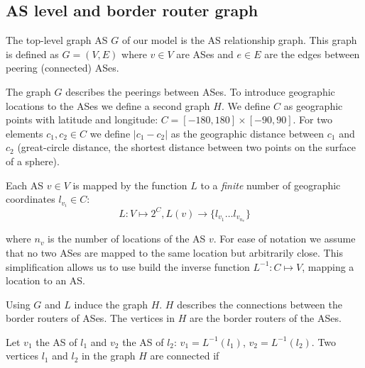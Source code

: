\documentclass{sig-alternate-10pt}
\begin{document}
\subsection{AS level and border router graph}
\label{sec:two-graphs}

The top-level graph AS  $G$ of our model is the AS relationship graph.  This graph is defined as $G=(V,E)$ where $v \in V$ are ASes and $e \in E$ are the edges between peering (connected) ASes. 

The graph $G$ describes the peerings between ASes. To introduce geographic locations to the ASes we define a second graph $H$. We define $C$ as geographic points with latitude and longitude: $C = [-180,180] \times [-90,90]$. For two elements $c_1,c_2 \in C$ we define $|c_1 - c_2|$ as the geographic distance between $c_1$ and $c_2$ (great-circle distance, the shortest distance between two points on the surface of a sphere).

Each AS $v \in V$ is mapped by the function $L$ to a \emph{finite} number of geographic coordinates $l_{v_i} \in C$:  
\begin{equation}\label{lgleichung} L: V \mapsto 2^C, L(v) \rightarrow \{l_{v_1} \ldots l_{v_{n_v}}\} \end{equation}

\noindent where $n_v$ is the number of locations of the AS $v$. For ease of notation we assume that no two ASes are mapped to the same location but arbitrarily close. This simplification allows us to use build the inverse function $L^{-1}: C \mapsto V$, mapping a location to an AS. 

Using $G$ and $L$ induce the graph $H$. $H$ describes the connections between the border routers of ASes. The vertices in $H$ are the border routers of the ASes. 

Let $v_1$ the AS of $l_1$ and $v_2$ the AS of $l_2$: $v_1 = L^{-1}(l_1)$, $v_2= L^{-1}(l_2)$. Two vertices $l_1$ and $l_2$ in the graph $H$ are connected if
\end{document}
